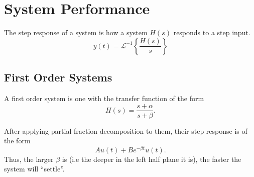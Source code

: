 \section{System Performance}
\begin{definition}
  The step response of a system is how a system $H(s)$ responds to a step input.
  \[
	y(t) = \mathcal{L}^{-1}\left\{ \frac{H(s)}{s} \right\}
  \]
  \label{defn:step-response}
\end{definition}

\subsection{First Order Systems}
\begin{definition}
  A first order system is one with the transfer function of the form
  \[
	H(s) = \frac{s+\alpha}{s+\beta}.
  \]
  \label{defn:first-order}
\end{definition}
After applying partial fraction decomposition to them, their step response is of the form
\[
  Au(t) + Be^{-\beta t}u(t).
\]
Thus, the larger $\beta$ is (i.e the deeper in the left half plane it is), the faster the system will ``settle''.
